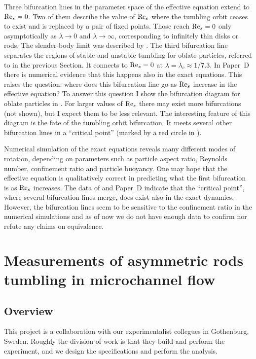 \documentclass[thesis.tex]{subfiles}
\begin{document}
Three bifurcation lines in the parameter space of the effective equation extend to $\textrm{Re}_s=0$. Two of them describe the value of $\textrm{Re}_s$ where the tumbling orbit ceases to exist and is replaced by a pair of fixed points. Those reach $\textrm{Re}_s=0$ only asymptotically as $\lambda\to0$ and $\lambda\to\infty$, corresponding to infinitely thin disks or rods. The slender-body limit was described by \citet{subramanian2005}. The third bifurcation line separates the regions of stable and unstable tumbling for oblate particles, referred to in the previous Section. It connects to $\textrm{Re}_s=0$ at $\lambda=\lambda_c\approx1/7.3$. In Paper~D there is numerical evidence that this happens also in the exact equations. This raises the question: where does this bifurcation line go as $\textrm{Re}_s$ increase in the effective equation?
To answer this question I show the bifurcation diagram for oblate particles in . For larger values of $\textrm{Re}_s$ there may exist more bifurcations (not shown), but I expect them to be less relevant. The interesting feature of this diagram is the fate of the tumbling orbit bifurcation. It meets several other bifurcation lines in a ``critical point'' (marked by a red circle in ). 

Numerical simulation of the exact equations reveals many different modes of rotation, depending on parameters such as particle aspect ratio, Reynolds number, confinement ratio and particle buoyancy. One may hope that the effective equation is qualitatively correct in predicting what the first bifurcation is as $\textrm{Re}_s$ increases. The data of \citet{rosen2015b} and Paper~D indicate that the ``critical point'', where several bifurcation lines merge, does exist also in the exact dynamics. However, the bifurcation lines seem to be sensitive to the confinement ratio in the numerical simulations and as of now we do not have enough data to confirm nor refute any claims on equivalence.

\raggedbottom\makeatletter
\afterpage{\global\let\@textbottom\relax \global\let\@texttop\relax}

\chapter[Measurements of asymmetric rods]{Measurements of asymmetric rods tumbling in microchannel flow}
\section{Overview}
This project is a collaboration with our experimentalist collegues in Gothenburg, Sweden. Roughly the division of work is that they build and perform the experiment, and we design the specifications and perform the analysis.
\end{document}
